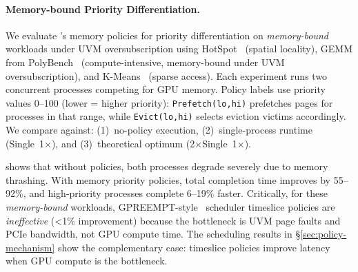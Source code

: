 \paragraph{Memory-bound Priority Differentiation.}
We evaluate \sys's memory policies for priority differentiation on \emph{memory-bound} workloads under UVM oversubscription using HotSpot~\cite{che2009rodinia} (spatial locality), GEMM from PolyBench~\cite{grauer2012auto} (compute-intensive, memory-bound under UVM oversubscription), and K-Means~\cite{gu2020uvmbench} (sparse access).
Each experiment runs two concurrent processes competing for GPU memory.
Policy labels use priority values 0--100 (lower = higher priority): \texttt{Prefetch(lo,hi)} prefetches pages for processes in that range, while \texttt{Evict(lo,hi)} selects eviction victims accordingly.
We compare against: (1)~no-policy execution, (2)~single-process runtime (Single~1$\times$), and (3)~theoretical optimum (2$\times$Single~1$\times$).

 shows that without policies, both processes degrade severely due to memory thrashing.
With \sys memory priority policies, total completion time improves by 55--92\%, and high-priority processes complete 6--19\% faster.
Critically, for these \emph{memory-bound} workloads, GPREEMPT-style~\cite{fan2025gpreempt} scheduler timeslice policies are \emph{ineffective} (<1\% improvement) because the bottleneck is UVM page faults and PCIe bandwidth, not GPU compute time.
The scheduling results in \S\ref{sec:policy-mechanism} show the complementary case: timeslice policies improve latency when GPU compute is the bottleneck.

